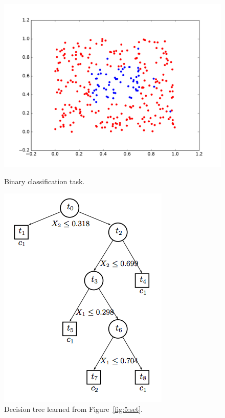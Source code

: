 \documentclass[master]{IPSstyle}
\begin{document}
{\begin{figure}[H]
\centering
\begin{minipage}{0.55\textwidth}
\hspace{-0.5cm}
\centering
    \includegraphics[width=\textwidth]{figures/ch5_learningset.pdf}
    \caption{Binary classification task.}
    \label{fig:5:set}
\end{minipage}\hfill
\begin{minipage}{0.45\textwidth}
\centering
    \includegraphics[scale=0.5]{figures/ch5_tree.pdf}
    \caption{Decision tree learned from Figure~\ref{fig:5:set}.}
    \label{fig:5:tree}
\end{minipage}
\end{figure}

}
\end{document}
